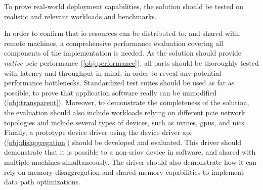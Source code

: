 \begin{objective}\label{obj:experiments}
    To prove real-world deployment capabilities, the solution should be tested on realistic and relevant workloads and benchmarks.
\end{objective}
In order to confirm that \gls{io} resources can be distributed to, and shared with, remote machines, a comprehensive performance evaluation covering all components of the implementation is needed.
%
As the solution should provide \emph{native} \gls{pcie} performance (\cref{obj:performance}), all parts should be thoroughly tested with latency and throughput in mind, in order to reveal any potential performance bottlenecks.
Standardized test suites should be used as far as possible, to prove that application software really can be unmodified (\cref{obj:transparent}).
%
Moreover, to demonstrate the completeness of the solution, the evaluation should also include workloads relying on different \gls{pcie} network topologies and include several types of devices, such as \glspl{nvme}, \glspl{gpu}, and \glspl{nic}.
%
Finally, a prototype device driver using the device driver \gls{api} (\cref{obj:disaggregation}) should be developed and evaluated. This driver should demonstrate that it is possible to  a non-\gls{sriov} device in software, and shared with multiple machines simultaneously. 
%
The driver should also demonstrate how it can rely on memory \gls{disaggregation} and shared memory capabilities to implement data path optimizations.



